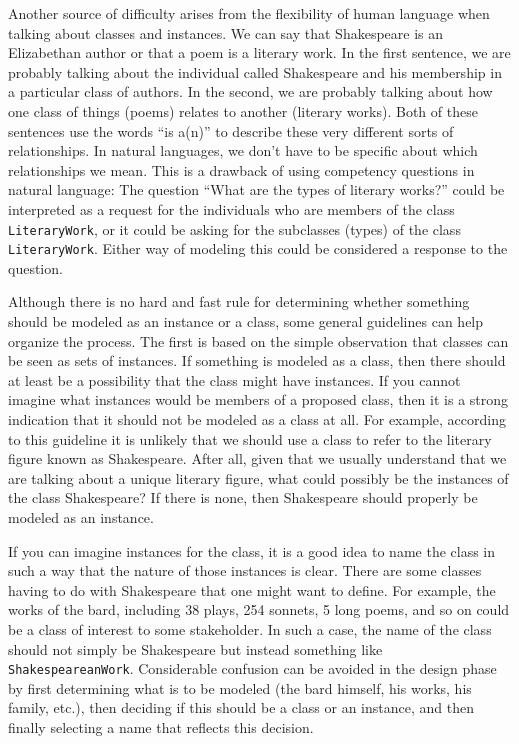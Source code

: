 Another source of difficulty arises from the flexibility of human
language when talking about
classes and instances. We can say that Shakespeare is an Elizabethan
author or that a poem is a literary work. In the first sentence, we are
probably talking about the individual called Shakespeare and his
membership in a particular class of authors. In the second, we are
probably talking about how one class of things (poems) relates to
another (literary works). Both of these sentences use the words ``is
a(n)'' to describe these very different sorts of relationships. In
natural languages, we don't have to be specific about which
relationships we mean. This is a drawback of using competency questions
in natural language: The question ``What are the types of literary
works?'' could be interpreted as a request for the individuals who are
members of the class \texttt{LiteraryWork}, or it could be asking for the
subclasses (types) of the class \texttt{LiteraryWork}. Either way of modeling
this could be considered a response to the question.

Although there is no hard and fast rule for determining whether
something should be modeled as an instance or a class, some general
guidelines can help organize the process. The first is based on the
simple observation that classes can be seen as sets of instances. If
something is modeled as a class, then there should at least be a
possibility that the class might have instances. If you cannot imagine
what instances would be members of a proposed class, then it is a strong
indication that it should not be modeled as a class at all. For example,
according to this guideline it is unlikely that we should use
a class to refer to the literary figure known as Shakespeare. After all,
given that we usually understand that we are talking about a unique
literary figure, what could possibly be the instances of the class
Shakespeare? If there is none, then Shakespeare should properly be
modeled as an instance.

If you can imagine instances for the class, it is a good idea to name
the class in such a way that the nature of those instances is clear.
There are some classes having to do with Shakespeare that one might want
to define. For example, the works of the bard, including 38 plays, 254
sonnets, 5 long poems, and so on could be a class of interest to some
stakeholder. In such a case, the name of the class should not simply be
Shakespeare but instead something like \texttt{ShakespeareanWork}. Considerable
confusion can be avoided in the design phase by first determining what
is to be modeled (the bard himself, his works, his family, etc.), then
deciding if this should be a class or an instance, and then finally
selecting a name that reflects this decision.

